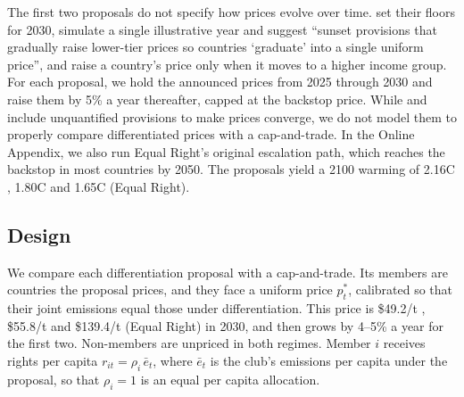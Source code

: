 \documentclass[12pt,english]{article}
\theoremstyle{remark}
\begin{document}
The first two proposals do not specify how prices evolve over time. \citet{parry_proposal_2021} set their floors for 2030, \citet{wolfram_building_2025} simulate a single illustrative year and suggest ``sunset provisions that gradually raise lower-tier prices so countries `graduate' into a single uniform price'', and \citet{banerjee_grand_2025} raise a country's price only when it moves to a higher income group. %
For each proposal, we hold the announced prices from 2025 through 2030 and raise them by 5\% a year thereafter, capped at the backstop price. While \cite{wolfram_building_2025} and \citet{banerjee_grand_2025} include unquantified provisions to make prices converge, we do not model them to properly compare differentiated prices with a cap-and-trade. In the Online Appendix, we also run Equal Right's original escalation path, which reaches the backstop in most countries by 2050. The proposals yield a 2100 warming of 2.16\textdegree C \citep{wolfram_building_2025}, 1.80\textdegree C \citep{banerjee_grand_2025} and 1.65\textdegree C (Equal Right). %

\subsection{Design}

We compare each differentiation proposal with a cap-and-trade. Its members are countries the proposal prices, and they face a uniform price $p^*_t$, calibrated so that their joint emissions equal those under differentiation. This price is \$49.2/t \citep{wolfram_building_2025}, \$55.8/t \citep{banerjee_grand_2025} and \$139.4/t (Equal Right) in 2030, and then grows by 4--5\% a year for the first two. %
Non-members are unpriced in both regimes. Member $i$ receives rights per capita $r_{it}=\rho_i\,\bar e_t$, where $\bar e_t$ is the club's emissions per capita under the proposal, so that $\rho_i=1$ is an equal per capita allocation.
\end{document}

